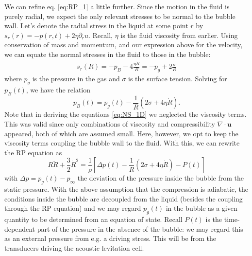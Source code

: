 \documentclass[rmp,aps,nofootinbib,superscriptaddress,floatfix]{revtex4-2}
\begin{document}
We can refine eq. \ref{eq:RP_1} a little further. Since the motion in the fluid is purely radial, we expect the only relevant stresses to be normal to the bubble wall. Let's denote the radial stress in the liquid at some point $r$ by $s_r(r)=-p(r,t)+2\eta \partial_r u$. Recall, $\eta$ is the fluid viscosity from earlier. Using conservation of mass and momentum, and our expression above for the velocity, we can equate the normal stresses in the fluid to those in the bubble:
\begin{equation}
\begin{split}
    s_r(R)=-p_B-4\frac{\eta \dot{R}}{R}=-p_g+2\frac{\sigma}{R}
\end{split}
\end{equation}
where $p_g$ is the pressure in the gas and $\sigma$ is the surface tension. Solving for $p_B(t)$, we have the relation \cite{brenner2002single,prosperetti1999old,prosperetti1986bubble}
\begin{equation}
    p_B(t)=p_g(t)-\frac{1}{R}\left( 2\sigma+4\eta \dot{R} \right)
    \label{eq:p_B}.
\end{equation}
Note that in deriving the equations \ref{eq:NS_1D} we neglected the viscosity terms. This was valid since only combinations of viscosity and compressibility $\nabla \cdot \bm{u}$ appeared, both of which are assumed small. Here, however, we opt to keep the viscosity terms coupling the bubble wall to the fluid. With this, we can rewrite the RP equation as 
\begin{equation}
    R\ddot{R}+\frac{3}{2}\dot{R}^2 = \frac{1}{\rho} \left[ \Delta p(t)-\frac{1}{R}\left( 2\sigma+4\eta \dot{R} \right)-P(t) \right]
    \label{eq:RP_2}
\end{equation}
with $\Delta p = p_g(t)-p_\infty$ the deviation of the pressure inside the bubble from the static pressure. With the above assumption that the compression is adiabatic, the conditions inside the bubble are decoupled from the liquid (besides the coupling through the RP equation) and we may regard $p_g(t)$ in the bubble as a given quantity to be determined from an equation of state. Recall $P(t)$ is the time-dependent part of the pressure in the absence of the bubble: we may regard this as an external pressure from e.g. a driving stress. This will be from the transducers driving the acoustic levitation cell.
\end{document}
